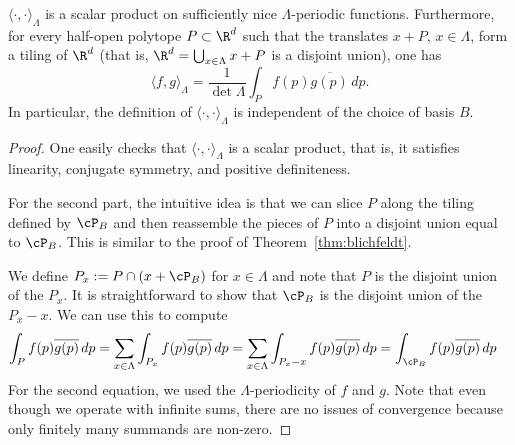 \begin{lemma}
  $\langle \cdot, \cdot \rangle_\Lambda$ is a scalar product on
  sufficiently nice $\Lambda$-periodic functions.
  Furthermore, for every half-open polytope $P \subset \R^d$ such that
  the translates $x + P$, $x \in \Lambda$, form a tiling of $\R^d$
  (that is, $\R^d = \bigcup_{x\in \Lambda} x + P$ is a disjoint union),
  one has
  \[
    \langle f, g \rangle_\Lambda = \frac{1}{\det \Lambda} \int_{P} f(p) \overline{g(p)} \,dp.
  \]
  In particular, the definition of $\langle \cdot, \cdot \rangle_\Lambda$
  is independent of the choice of basis $B$.
\end{lemma}
\begin{proof}
  One easily checks that $\langle \cdot, \cdot \rangle_\Lambda$
  is a scalar product, that is, it satisfies linearity, conjugate symmetry, and positive definiteness.

  For the second part,
  the intuitive idea is that we can slice $P$ along the tiling defined by $\cP_B$
  and then reassemble the pieces of $P$ into a disjoint union
  equal to $\cP_B$.
  This is similar to the proof of Theorem~\ref{thm:blichfeldt}.

  We define $P_x := P \cap (x + \cP_B)$ for $x \in \Lambda$
  and note that $P$ is the disjoint union of the $P_x$.
  It is straightforward to show that $\cP_B$ is the disjoint union of the $P_x - x$.
  We can use this to compute
  \begin{align*}
    \int_P f(p) \overline{g(p)} \,dp &= \sum_{x \in \Lambda} \int_{P_x} f(p) \overline{g(p)} \,dp
      = \sum_{x \in \Lambda} \int_{P_x - x} f(p) \overline{g(p)} \,dp
      = \int_{\cP_B} f(p) \overline{g(p)} \,dp
  \end{align*}
  For the second equation, we used the $\Lambda$-periodicity of $f$ and $g$.
  Note that even though we operate with infinite sums,
  there are no issues of convergence because only finitely many summands are non-zero.
\end{proof}

